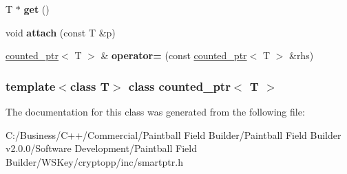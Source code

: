 \begin{DoxyCompactItemize}
\item 
\hypertarget{classcounted__ptr_ada23e80b4c656c9cbcc8dae43c7caa3a}{
T $\ast$ {\bfseries get} ()}
\label{classcounted__ptr_ada23e80b4c656c9cbcc8dae43c7caa3a}

\item 
\hypertarget{classcounted__ptr_a09a2d2772ced9edcb5c787534e6221b9}{
void {\bfseries attach} (const T \&p)}
\label{classcounted__ptr_a09a2d2772ced9edcb5c787534e6221b9}

\item 
\hypertarget{classcounted__ptr_ace78083c322daa7e82408407d6eabc91}{
\hyperlink{classcounted__ptr}{counted\_\-ptr}$<$ T $>$ \& {\bfseries operator=} (const \hyperlink{classcounted__ptr}{counted\_\-ptr}$<$ T $>$ \&rhs)}
\label{classcounted__ptr_ace78083c322daa7e82408407d6eabc91}

\end{DoxyCompactItemize}
\subsubsection*{template$<$class T$>$ class counted\_\-ptr$<$ T $>$}



The documentation for this class was generated from the following file:\begin{DoxyCompactItemize}
\item 
C:/Business/C++/Commercial/Paintball Field Builder/Paintball Field Builder v2.0.0/Software Development/Paintball Field Builder/WSKey/cryptopp/inc/smartptr.h\end{DoxyCompactItemize}
